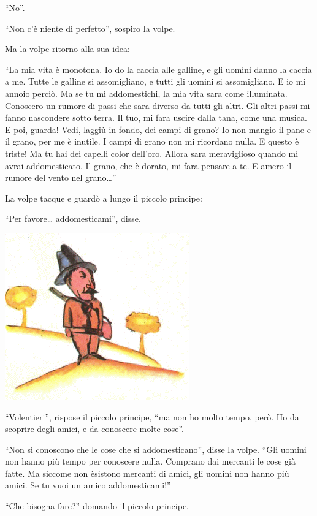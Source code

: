 \documentclass[11pt]{scrbook}
\begin{document}
``No''.

``Non c'è niente di perfetto'', sospiro la volpe.

Ma la volpe ritorno alla sua idea:

``La mia vita è monotona. Io do la caccia alle galline, e gli uomini
danno la caccia a me. Tutte le galline si assomigliano, e tutti gli
uomini si assomigliano. E io mi annoio perciò. Ma se tu mi addomestichi,
la mia vita sara come illuminata. Conoscero un rumore di passi che sara
diverso da tutti gli altri. Gli altri passi mi fanno nascondere sotto
terra. Il tuo, mi fara uscire dalla tana, come una musica. E poi,
guarda! Vedi, laggiù in fondo, dei campi di grano? Io non mangio il pane
e il grano, per me è inutile. I campi di grano non mi ricordano nulla. E
questo è triste! Ma tu hai dei capelli color dell'oro. Allora sara
meraviglioso quando mi avrai addomesticato. Il grano, che è dorato, mi
fara pensare a te. E amero il rumore del vento nel grano\ldots{}''

La volpe tacque e guardò a lungo il piccolo principe:

``Per favore\ldots{} addomesticami'', disse.

\begin{center}
\includegraphics{./img/myslivec.png}
\end{center}

``Volentieri'', rispose il piccolo principe, ``ma non ho molto tempo,
però. Ho da scoprire degli amici, e da conoscere molte cose''.

``Non si conoscono che le cose che si addomesticano'', disse la volpe.
``Gli uomini non hanno più tempo per conoscere nulla. Comprano dai
mercanti le cose già fatte. Ma siccome non èsistono mercanti di amici,
gli uomini non hanno più amici. Se tu vuoi un amico addomesticami!''

``Che bisogna fare?'' domando il piccolo principe.
\end{document}
